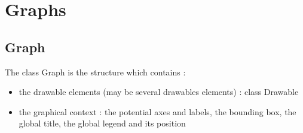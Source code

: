 

\newpage

\section{Graphs}


\subsection{Graph}

The class Graph is the structure which contains :
\begin{itemize}
\item the drawable elements (may be several drawables elements) : class Drawable
\item the graphical context : the potential axes and labels, the bounding box, the global title, the global legend and its position
\end{itemize}


